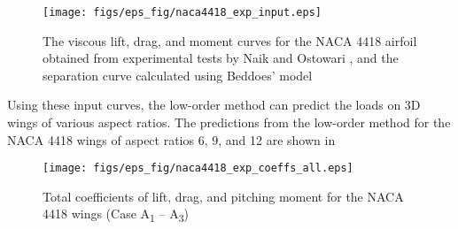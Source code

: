 \begin{figure}[!h]
    \centering
    \texttt{[image: figs/eps\_fig/naca4418\_exp\_input.eps]}
    \caption{The viscous lift, drag, and moment curves for the NACA 4418 airfoil obtained from experimental tests by Naik and Ostowari \cite{naik_ostowari_nrel}, and the separation curve calculated using Beddoes' model}
    \label{fig:exp-coeffs}
\end{figure}

Using these input curves, the low-order method can predict the loads on 3D wings of various aspect ratios.
The predictions from the low-order method for the NACA 4418 wings of aspect ratios 6, 9, and 12 are shown in  %
%
\begin{figure*}[!h]
    \centering
    \texttt{[image: figs/eps\_fig/naca4418\_exp\_coeffs\_all.eps]}
    \caption{Total coefficients of lift, drag, and pitching moment  for the NACA 4418 wings (Case A\textsubscript{1} -- A\textsubscript{3})}
    \label{fig:exp-n4418-coeffs}
\end{figure*}



